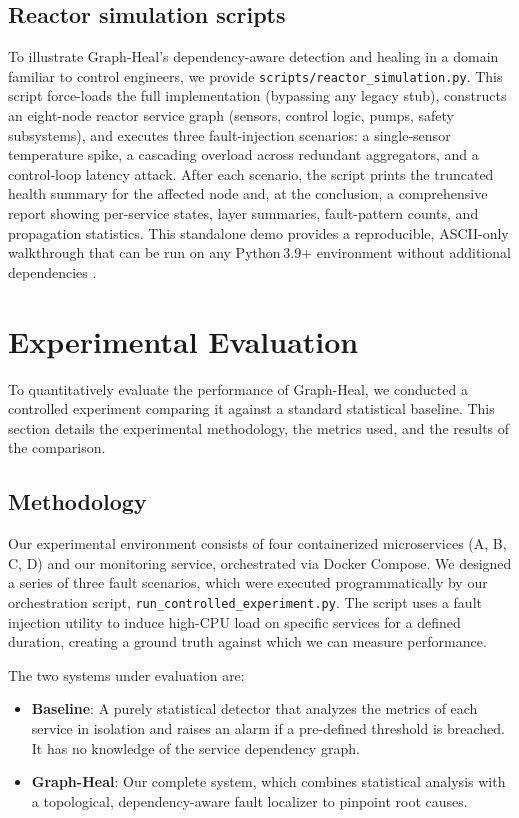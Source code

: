 \documentclass[11pt,conference]{IEEEtran}
\begin{document}
\subsection{Reactor simulation scripts}
\label{sec:reactor-simulation}

To illustrate Graph-Heal's dependency-aware detection and healing in a domain familiar to control engineers, we provide \texttt{scripts/reactor\_simulation.py}. This script force-loads the full implementation (bypassing any legacy stub), constructs an eight-node reactor service graph (sensors, control logic, pumps, safety subsystems), and executes three fault-injection scenarios: a single‐sensor temperature spike, a cascading overload across redundant aggregators, and a control‐loop latency attack. After each scenario, the script prints the truncated health summary for the affected node and, at the conclusion, a comprehensive report showing per-service states, layer summaries, fault-pattern counts, and propagation statistics. This standalone demo provides a reproducible, ASCII-only walkthrough that can be run on any Python 3.9+ environment without additional dependencies \cite{code3}.

\section{Experimental Evaluation}
\label{sec:evaluation}

To quantitatively evaluate the performance of Graph-Heal, we conducted a controlled experiment comparing it against a standard statistical baseline. This section details the experimental methodology, the metrics used, and the results of the comparison.

\subsection{Methodology}
Our experimental environment consists of four containerized microservices (A, B, C, D) and our monitoring service, orchestrated via Docker Compose. We designed a series of three fault scenarios, which were executed programmatically by our orchestration script, \texttt{run\_controlled\_experiment.py}. The script uses a fault injection utility to induce high-CPU load on specific services for a defined duration, creating a ground truth against which we can measure performance.

The two systems under evaluation are:
\begin{itemize}
    \item \textbf{Baseline}: A purely statistical detector that analyzes the metrics of each service in isolation and raises an alarm if a pre-defined threshold is breached. It has no knowledge of the service dependency graph.
    \item \textbf{Graph-Heal}: Our complete system, which combines statistical analysis with a topological, dependency-aware fault localizer to pinpoint root causes.
\end{itemize}
\end{document}
